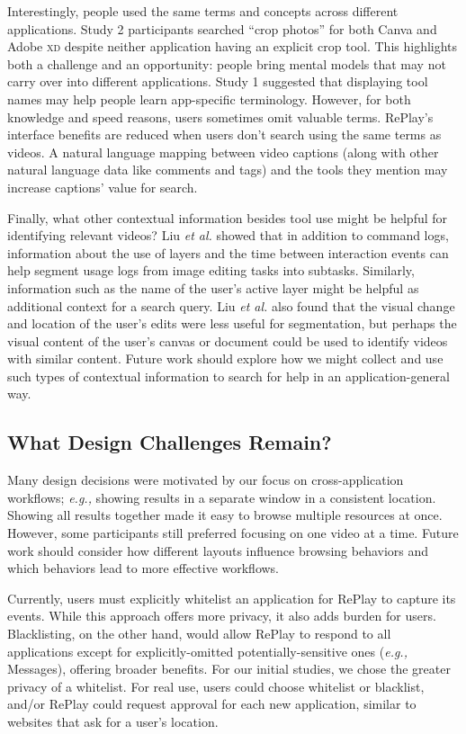 Interestingly, people used the same terms and concepts across different applications. Study 2 participants searched ``crop photos'' for both Canva and Adobe \textsc{xd} despite neither application having an explicit crop tool. This highlights both a challenge and an opportunity: people bring mental models that may not carry over into different applications. Study 1 suggested that displaying tool names may help people learn app-specific terminology. However, for both knowledge and speed reasons, users sometimes omit valuable terms. RePlay's interface benefits are reduced when users don't search using the same terms as videos. A natural language mapping \cite{Adar2014} between video captions (along with other natural language data like comments and tags) and the tools they mention may increase captions' value for search.

Finally, what other contextual information besides tool use might be helpful for identifying relevant videos? Liu \textit{et al.} \cite{Liu2020} showed that in addition to command logs, information about the use of layers and the time between interaction events can help segment usage logs from image editing tasks into subtasks. Similarly, information such as the name of the user's active layer might be helpful as additional context for a search query. Liu \textit{et al.} also found that the visual change and location of the user's edits were less useful for segmentation, but perhaps the visual content of the user's canvas or document could be used to identify videos with similar content. Future work should explore how we might collect and use such types of contextual information to search for help in an application-general way.

\subsection{What Design Challenges Remain?}
Many design decisions were motivated by our focus on cross-application workflows; \textit{e.g.,} showing results in a separate window in a consistent location. Showing all results together made it easy to browse multiple resources at once. However, some participants still preferred focusing on one video at a time. Future work should consider how different layouts influence browsing behaviors and which behaviors lead to more effective workflows.

Currently, users must explicitly whitelist an application for RePlay to capture its events. While this approach offers more privacy, it also adds burden for users.  Blacklisting, on the other hand, would allow RePlay to respond to all applications except for explicitly-omitted potentially-sensitive ones (\textit{e.g.,} Messages), offering broader benefits. For our initial studies, we chose the greater privacy of a whitelist. For real use, users could choose whitelist or blacklist, and/or RePlay could request approval for each new application, similar to websites that ask for a user's location.

